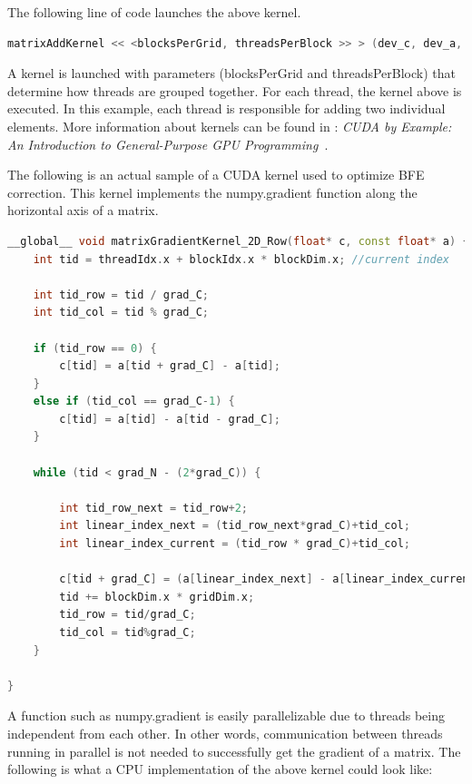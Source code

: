 \documentclass[DM,authoryear,toc]{lsstdoc}
\begin{document}
The following line of code launches the above kernel.

\begin{lstlisting}[language=C++,basicstyle=\small,frame=single]
matrixAddKernel << <blocksPerGrid, threadsPerBlock >> > (dev_c, dev_a, dev_b);
\end{lstlisting}

A kernel is launched with parameters (blocksPerGrid and threadsPerBlock) that determine how threads are grouped together. For each thread, the kernel above is executed. In this example, each thread is responsible for adding two individual elements. More information about kernels can be found in \cite{cudaex:2010}: \emph{CUDA by Example: An Introduction to General-Purpose GPU Programming}~.

The following is an actual sample of a CUDA kernel used to optimize BFE correction. This kernel implements the numpy.gradient function along the horizontal axis of a matrix.

\begin{lstlisting}[language=C++,basicstyle=\small,frame=single]
__global__ void matrixGradientKernel_2D_Row(float* c, const float* a) {
    int tid = threadIdx.x + blockIdx.x * blockDim.x; //current index
    
    int tid_row = tid / grad_C;
    int tid_col = tid % grad_C;
    
    if (tid_row == 0) {
        c[tid] = a[tid + grad_C] - a[tid];
    }
    else if (tid_col == grad_C-1) {
        c[tid] = a[tid] - a[tid - grad_C];
    }

    while (tid < grad_N - (2*grad_C)) {
        
        int tid_row_next = tid_row+2;
        int linear_index_next = (tid_row_next*grad_C)+tid_col;
        int linear_index_current = (tid_row * grad_C)+tid_col;

        c[tid + grad_C] = (a[linear_index_next] - a[linear_index_current])/2;        
        tid += blockDim.x * gridDim.x;
        tid_row = tid/grad_C;
        tid_col = tid%grad_C;
    }

}
\end{lstlisting}

A function such as numpy.gradient is easily parallelizable due to threads being independent from each other. In other words, communication between threads running in parallel is not needed to successfully get the gradient of a matrix. The following is what a CPU implementation of the above kernel could look like:
\end{document}
